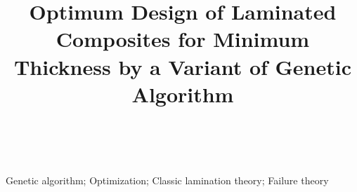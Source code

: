 \documentclass[twocolumn]{IEEEtran}
\begin{document}
%
\title{Optimum Design of Laminated Composites for Minimum Thickness by a Variant
of Genetic Algorithm}


\author{\\
}



\maketitle



\begin{abstract}
	
\end{abstract}

\begin{IEEEkeywords}
Genetic algorithm; Optimization; Classic lamination theory; Failure theory
\end{IEEEkeywords}


%
\IEEEpeerreviewmaketitle











%
%
\printbibliography
\end{document}
